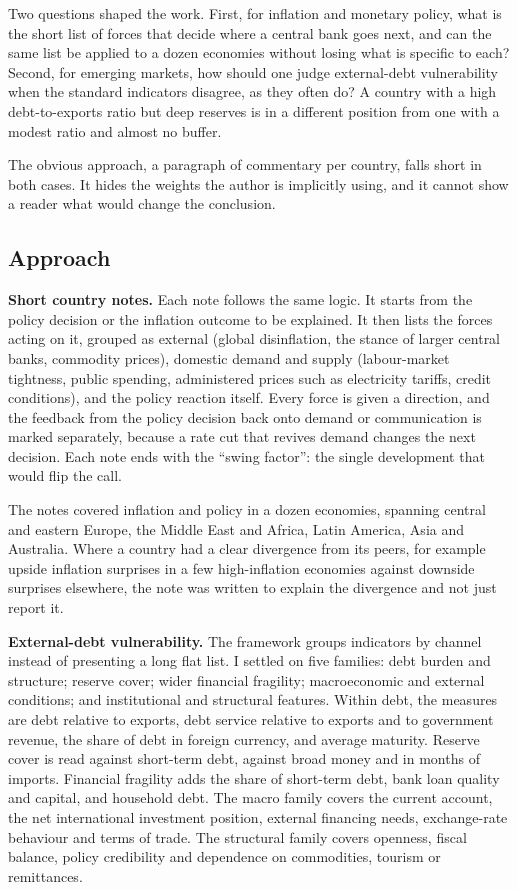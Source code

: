 \documentclass[
  british,
  a4paper,
]{article}
\begin{document}
Two questions shaped the work. First, for inflation and monetary policy,
what is the short list of forces that decide where a central bank goes
next, and can the same list be applied to a dozen economies without
losing what is specific to each? Second, for emerging markets, how
should one judge external-debt vulnerability when the standard
indicators disagree, as they often do? A country with a high
debt-to-exports ratio but deep reserves is in a different position from
one with a modest ratio and almost no buffer.

The obvious approach, a paragraph of commentary per country, falls short
in both cases. It hides the weights the author is implicitly using, and
it cannot show a reader what would change the conclusion.

\subsection{Approach}\label{approach}

\textbf{Short country notes.} Each note follows the same logic. It
starts from the policy decision or the inflation outcome to be
explained. It then lists the forces acting on it, grouped as external
(global disinflation, the stance of larger central banks, commodity
prices), domestic demand and supply (labour-market tightness, public
spending, administered prices such as electricity tariffs, credit
conditions), and the policy reaction itself. Every force is given a
direction, and the feedback from the policy decision back onto demand or
communication is marked separately, because a rate cut that revives
demand changes the next decision. Each note ends with the ``swing
factor'': the single development that would flip the call.

The notes covered inflation and policy in a dozen economies, spanning
central and eastern Europe, the Middle East and Africa, Latin America,
Asia and Australia. Where a country had a clear divergence from its
peers, for example upside inflation surprises in a few high-inflation
economies against downside surprises elsewhere, the note was written to
explain the divergence and not just report it.

\textbf{External-debt vulnerability.} The framework groups indicators by
channel instead of presenting a long flat list. I settled on five
families: debt burden and structure; reserve cover; wider financial
fragility; macroeconomic and external conditions; and institutional and
structural features. Within debt, the measures are debt relative to
exports, debt service relative to exports and to government revenue, the
share of debt in foreign currency, and average maturity. Reserve cover
is read against short-term debt, against broad money and in months of
imports. Financial fragility adds the share of short-term debt, bank
loan quality and capital, and household debt. The macro family covers
the current account, the net international investment position, external
financing needs, exchange-rate behaviour and terms of trade. The
structural family covers openness, fiscal balance, policy credibility
and dependence on commodities, tourism or remittances.
\end{document}
